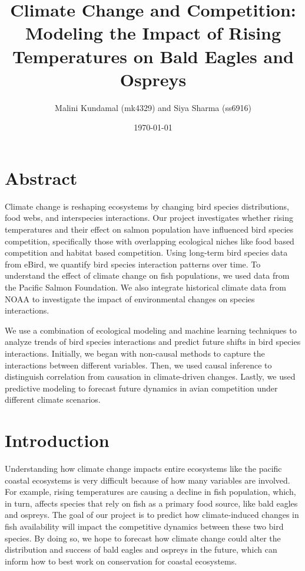 \documentclass{article}
\begin{document}
\title{\textbf{Climate Change and Competition: Modeling the Impact of Rising Temperatures on Bald Eagles and Ospreys
}}
\date{\today}
\author{Malini Kundamal (mk4329) and Siya Sharma (ss6916)}

\maketitle

\section{Abstract}
Climate change is reshaping ecosystems by changing bird species distributions, food webs, and interspecies interactions. Our project investigates whether rising temperatures and their effect on salmon population have influenced bird species competition, specifically those with overlapping ecological niches like food based competition and habitat based competition. Using long-term bird species data from eBird, we quantify bird species interaction patterns over time. To understand the effect of climate change on fish populations, we used data from the Pacific Salmon Foundation. We also integrate historical climate data from NOAA to investigate the impact of environmental changes on species interactions. 

We use a combination of ecological modeling and machine learning techniques to analyze trends of bird species interactions and predict future shifts in bird species interactions. Initially, we began with non-causal methods to capture the interactions between different variables. Then, we used causal inference to distinguish correlation from causation in climate-driven changes. Lastly, we used predictive modeling to forecast future dynamics in avian competition under different climate scenarios. 

\section{Introduction}
Understanding how climate change impacts entire ecosystems like the pacific coastal ecosystems is very difficult because of how many variables are involved. For example, rising temperatures are causing a decline in fish population, which, in turn, affects species that rely on fish as a primary food source, like bald eagles and ospreys. The goal of our project is to predict how climate-induced changes in fish availability will impact the competitive dynamics between these two bird species. By doing so, we hope to forecast how climate change could alter the distribution and success of bald eagles and ospreys in the future, which can inform how to best work on conservation for coastal ecosystems.
\end{document}
